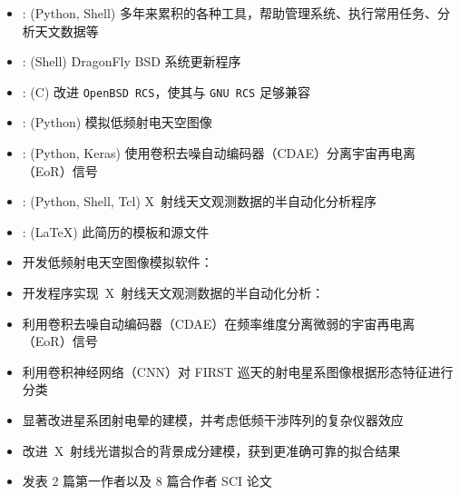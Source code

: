\documentclass[zh]{resume}
\begin{document}
\begin{itemize}
  \item {}:
    (Python, Shell)
    多年来累积的各种工具，帮助管理系统、执行常用任务、分析天文数据等
  \item {}:
    (Shell)
    DragonFly BSD 系统更新程序
  \item {}:
    (C)
    改进 \texttt{OpenBSD RCS}，使其与 \texttt{GNU RCS} 足够兼容
  \item {}:
    (Python)
    模拟低频射电天空图像
  \item {}:
    (Python, Keras)
    使用卷积去噪自动编码器（CDAE）分离宇宙再电离（EoR）信号
  \item {}:
    (Python, Shell, Tcl)
    X~射线天文观测数据的半自动化分析程序
  \item {}:
    (\LaTeX)
    此简历的模板和源文件
\end{itemize}

\begin{itemize}
  \item 开发低频射电天空图像模拟软件：
  \item 开发程序实现~X~射线天文观测数据的半自动化分析：
  \item 利用卷积去噪自动编码器（CDAE）在频率维度分离微弱的宇宙再电离（EoR）信号
  \item 利用卷积神经网络（CNN）对 FIRST 巡天的射电星系图像根据形态特征进行分类
  \item 显著改进星系团射电晕的建模，并考虑低频干涉阵列的复杂仪器效应
  \item 改进~X~射线光谱拟合的背景成分建模，获到更准确可靠的拟合结果
  \item 发表 2 篇第一作者以及 8 篇合作者 SCI 论文
\end{itemize}
\end{document}
